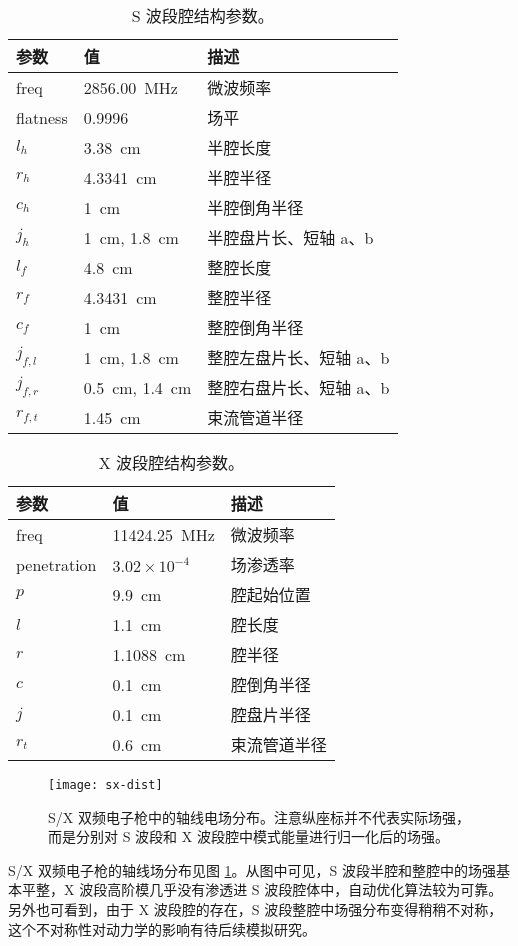 \begin{table}[htbp]
\centering
\caption{\label{tab:geo_s}
S 波段腔结构参数。}
\begin{tabular}{lll}
\toprule
参数 & 值 & 描述\\
\midrule
freq & \SI{2856.00}{MHz} & 微波频率  \\
flatness & 0.9996 & 场平  \\
\midrule
$l_h$ & \SI{3.38}{cm} & 半腔长度  \\
$r_h$ & \SI{4.3341}{cm} & 半腔半径  \\
$c_h$ & \SI{1}{cm} & 半腔倒角半径  \\
$j_h$ & \SI{1}{cm}, \SI{1.8}{cm} & 半腔盘片长、短轴 a、b \\
$l_f$ & \SI{4.8}{cm} & 整腔长度  \\
$r_f$ & \SI{4.3431}{cm} & 整腔半径  \\
$c_f$ & \SI{1}{cm} & 整腔倒角半径  \\
$j_{f, l}$ & \SI{1}{cm}, \SI{1.8}{cm} & 整腔左盘片长、短轴 a、b \\
$j_{f, r}$ & \SI{0.5}{cm}, \SI{1.4}{cm} & 整腔右盘片长、短轴 a、b \\
$r_{f, t}$ & \SI{1.45}{cm} & 束流管道半径  \\
\bottomrule
\end{tabular}
\end{table}

\begin{table}[htbp]
\centering
\caption{\label{tab:geo_x}
X 波段腔结构参数。}
\begin{tabular}{lll}
\toprule
参数 & 值 & 描述\\
\midrule
freq & \SI{11424.25}{MHz} & 微波频率  \\
penetration & $3.02\times10^{-4}$ & 场渗透率  \\
\midrule
$p$ & \SI{9.9}{cm} & 腔起始位置  \\
$l$ & \SI{1.1}{cm} & 腔长度  \\
$r$ & \SI{1.1088}{cm} & 腔半径  \\
$c$ & \SI{0.1}{cm} & 腔倒角半径  \\
$j$ & \SI{0.1}{cm} & 腔盘片半径  \\
$r_t$ & \SI{0.6}{cm} & 束流管道半径  \\
\bottomrule
\end{tabular}
\end{table}

\begin{figure}[htbp]
	\centering
	\texttt{[image: sx-dist]}
	\caption{
	S/X 双频电子枪中的轴线电场分布。注意纵座标并不代表实际场强，而是分别对 S 波段和 X 波段腔中模式能量进行归一化后的场强。}
	\label{fig:sx-fielddist}
\end{figure}
S/X 双频电子枪的轴线场分布见图 \ref{fig:sx-fielddist}。从图中可见，S 波段半腔和整腔中的场强基本平整，X 波段高阶模几乎没有渗透进 S 波段腔体中，自动优化算法较为可靠。另外也可看到，由于 X 波段腔的存在，S 波段整腔中场强分布变得稍稍不对称，这个不对称性对动力学的影响有待后续模拟研究。

